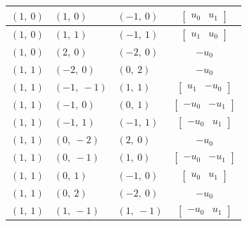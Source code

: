 \documentclass[11pt]{article}
\theoremstyle{definition}
\begin{document}
\begin{longtable}{|l|l|l|c|}
    \hline
    $\left( 1, \  0\right)$ & $\left( 1, \  0\right)$ & $\left( -1, \  0\right)$ & $\left[\begin{matrix}u_{0} & u_{1}\end{matrix}\right]$ \\
    \hline
    $\left( 1, \  0\right)$ & $\left( 1, \  1\right)$ & $\left( -1, \  1\right)$ & $\left[\begin{matrix}u_{1} & u_{0}\end{matrix}\right]$ \\
    \hline
    $\left( 1, \  0\right)$ & $\left( 2, \  0\right)$ & $\left( -2, \  0\right)$ & $- u_{0}$ \\
    \hline
    $\left( 1, \  1\right)$ & $\left( -2, \  0\right)$ & $\left( 0, \  2\right)$ & $- u_{0}$ \\
    \hline
    $\left( 1, \  1\right)$ & $\left( -1, \  -1\right)$ & $\left( 1, \  1\right)$ & $\left[\begin{matrix}u_{1} & - u_{0}\end{matrix}\right]$ \\
    \hline
    $\left( 1, \  1\right)$ & $\left( -1, \  0\right)$ & $\left( 0, \  1\right)$ & $\left[\begin{matrix}- u_{0} & - u_{1}\end{matrix}\right]$ \\
    \hline
    $\left( 1, \  1\right)$ & $\left( -1, \  1\right)$ & $\left( -1, \  1\right)$ & $\left[\begin{matrix}- u_{0} & u_{1}\end{matrix}\right]$ \\
    \hline
    $\left( 1, \  1\right)$ & $\left( 0, \  -2\right)$ & $\left( 2, \  0\right)$ & $- u_{0}$ \\
    \hline
    $\left( 1, \  1\right)$ & $\left( 0, \  -1\right)$ & $\left( 1, \  0\right)$ & $\left[\begin{matrix}- u_{0} & - u_{1}\end{matrix}\right]$ \\
    \hline
    $\left( 1, \  1\right)$ & $\left( 0, \  1\right)$ & $\left( -1, \  0\right)$ & $\left[\begin{matrix}u_{0} & u_{1}\end{matrix}\right]$ \\
    \hline
    $\left( 1, \  1\right)$ & $\left( 0, \  2\right)$ & $\left( -2, \  0\right)$ & $- u_{0}$ \\
    \hline
    $\left( 1, \  1\right)$ & $\left( 1, \  -1\right)$ & $\left( 1, \  -1\right)$ & $\left[\begin{matrix}- u_{0} & u_{1}\end{matrix}\right]$ \\

\end{longtable}
\end{document}
